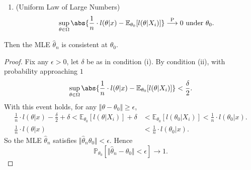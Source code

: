 \documentclass[a4paper]{article}
\begin{document}
\begin{thm}
\begin{enumerate}
\begin{minipage}{6cm}
\begin{center}
			\end{center}
		\end{minipage}
		\item (Uniform Law of Large Numbers)
		\begin{equation}
			\sup\limits_{\theta \in \Omega} \abs{\frac{1}{n} \cdot l(\theta|x) - \mathbb{E}_{\theta_0}[l(\theta|X_i)]} \stackrel{\text{P}}{\longrightarrow} 0 \text{ under } \theta_0.
		\end{equation}
	\end{enumerate}
	Then the MLE $\hat{\theta}_n$ is consistent at $\theta_0$.
\end{thm}

\begin{proof}
	Fix any $\epsilon > 0$, let $\delta$ be as in condition (i). By condition (ii), with probability approaching $1$
	\begin{equation*}
		\sup\limits_{\theta \in \Omega} \abs{\frac{1}{n} \cdot l(\theta|x) - \mathbb{E}_{\theta_0}[l(\theta|X_i)]} < \frac{\delta}{2}.
	\end{equation*}
	With this event holds, for any $\Vert \theta - \theta_0 \Vert \geq \epsilon$,
	\begin{equation*}
		\begin{aligned}
			\frac{1}{n} \cdot l(\theta|x) - \frac{\delta}{2} + \delta < \mathbb{E}_{\theta_0}[l(\theta|X_i)] + \delta &< \mathbb{E}_{\theta_0}[l(\theta_0|X_i)] < \frac{1}{n} \cdot l(\theta_0|x). \\
			\frac{1}{n} \cdot l(\theta|x) &< \frac{1}{n} \cdot l(\theta_0|x).
		\end{aligned}
	\end{equation*}
	So the MLE $\hat{\theta}_n$ satisfies $\Vert \hat{\theta}_n \theta_0 \Vert < \epsilon$. Hence
	\begin{equation}
		\mathbb{P}_{\theta_0}[\Vert \hat{\theta}_n - \theta_0 \Vert < \epsilon] \to 1.
	\end{equation}
\end{proof}
\end{document}
